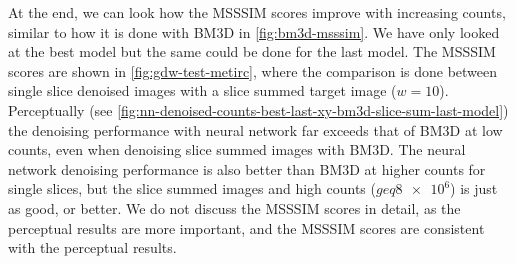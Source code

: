 At the end, we can look how the \gls{MSSSIM} scores improve with increasing counts, similar to how it is done with BM3D in \cref{fig:bm3d-msssim}. We have only looked at the best model but the same could be done for the last model. The \gls{MSSSIM} scores are shown in \cref{fig:gdw-test-metirc}, where the comparison is done between single slice denoised images with a slice summed target image ($w=10$). Perceptually (see \cref{fig:nn-denoised-counts-best-last-xy-bm3d-slice-sum-last-model}) the denoising performance with neural network far exceeds that of BM3D at low counts, even when denoising slice summed images with BM3D. The neural network denoising performance is also better than BM3D at higher counts for single slices, but the slice summed images and high counts ($geq \num{8e6}$) is just as good, or better. We do not discuss the \gls{MSSSIM} scores in detail, as the perceptual results are more important, and the \gls{MSSSIM} scores are consistent with the perceptual results.








